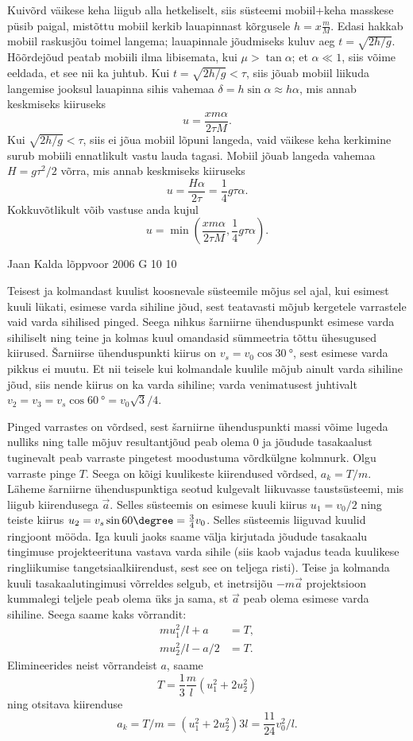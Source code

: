 \documentclass[11pt, twoside]{article}
\begin{document}
{{\ifSolution
Kuivõrd väikese keha liigub alla hetkeliselt, siis süsteemi mobiil+keha masskese püsib paigal, mistõttu mobiil kerkib lauapinnast kõrgusele $h=x\frac mM$.
Edasi hakkab mobiil raskusjõu toimel langema; lauapinnale jõudmiseks kuluv aeg $t=\sqrt{2h/g}$. Hõõrdejõud peatab mobiili ilma libisemata, kui $\mu>\tan\alpha$; et
$\alpha \ll 1$, siis võime eeldada, et see nii ka juhtub. Kui $t=\sqrt{2h/g}<\tau$, siis jõuab mobiil liikuda langemise jooksul lauapinna sihis vahemaa $\delta=h\sin\alpha\approx h\alpha$,
mis annab keskmiseks kiiruseks $$u=\frac{xm\alpha}{2\tau M}.$$ Kui $\sqrt{2h/g}<\tau$, siis ei jõua mobiil lõpuni langeda, vaid väikese keha kerkimine surub mobiili ennatlikult vastu lauda tagasi.
Mobiil jõuab langeda vahemaa $H=g\tau^2/2$ võrra, mis annab keskmiseks kiiruseks
$$u=\frac{H\alpha}{2\tau}=\frac 14 g\tau\alpha.$$
Kokkuvõtlikult võib vastuse anda kujul
$$u=\min\left(\frac{xm\alpha}{2\tau M}, \frac 14 g\tau\alpha\right).$$
\fi
}

{Jaan Kalda} %
{lõppvoor} %
{2006} %
{G 10} %
{10} %
{

\ifSolution
Teisest ja kolmandast kuulist koosnevale süsteemile mõjus sel ajal, kui esimest kuuli lükati, esimese varda sihiline jõud, sest teatavasti mõjub kergetele varrastele vaid varda sihilised pinged. Seega nihkus šarniirne ühenduspunkt esimese varda sihiliselt ning teine ja kolmas kuul omandasid sümmeetria tõttu ühesugused kiirused. Šarniirse ühenduspunkti kiirus on $v_s = v_0 \cos \SI{30}{\degree}$, sest esimese varda pikkus ei muutu. Et nii teisele kui kolmandale kuulile mõjub ainult varda sihiline jõud, siis nende kiirus on ka varda sihiline; varda venimatusest juhtivalt $v_2 = v_3 = v_s \cos \SI{60}{\degree} = v_0 \sqrt 3/4$.

Pinged varrastes on võrdsed, sest šarniirne ühenduspunkti massi võime lugeda nulliks ning talle mõjuv resultantjõud peab olema 0 ja jõudude tasakaalust tuginevalt peab varraste pingetest moodustuma võrdkülgne kolmnurk. Olgu varraste pinge $T$. Seega on kõigi kuulikeste kiirendused võrdsed, $a_k = T /m$. Läheme šarniirne ühenduspunktiga seotud kulgevalt liikuvasse taustsüsteemi, mis liigub kiirendusega $\vec a$. Selles süsteemis on esimese kuuli kiirus $u_1 = v_0/2$ ning teiste kiirus $u_2 = v_s \sin 60\degree = \frac{3}{4} v_0$. Selles süsteemis liiguvad kuulid ringjoont mööda. Iga kuuli jaoks saame välja kirjutada jõudude tasakaalu tingimuse projekteerituna vastava varda sihile (siis kaob vajadus teada kuulikese ringliikumise tangetsiaalkiirendust, sest see on teljega risti). Teise ja kolmanda kuuli tasakaalutingimusi võrreldes selgub, et inetrsijõu $-m\vec a$ projektsioon kummalegi teljele peab olema üks ja sama, st $\vec a$ peab olema esimese varda sihiline. Seega saame kaks võrrandit:
\[
\begin{aligned}
mu_1^2/l + a &= T,\\
mu_2^2/l - a/2 &= T.
\end{aligned}
\]
Elimineerides neist võrrandeist $a$, saame
\[
T=\frac{1}{3} \frac{m}{l}\left(u_{1}^{2}+2 u_2^{2}\right)
\]
ning otsitava kiirenduse
\[
a_{k}=T / m=\left(u_{1}^{2}+2 u_2^{2}\right) 3 l=\frac{11}{24} v_{0}^{2} / l.
\]
\fi
}

}
\end{document}
